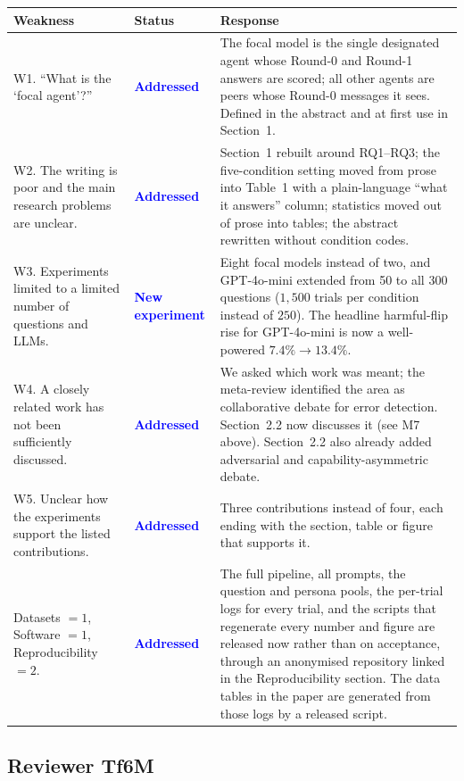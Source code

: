 \documentclass[11pt]{article}
\newcommand{\done}{\textcolor{blue}{\textbf{Addressed}}}
\newcommand{\newexp}{\textcolor{blue}{\textbf{New experiment}}}
\begin{document}
\begin{longtable}{@{}p{}p{}p{}@{}}
\toprule
\textbf{Weakness} & \textbf{Status} & \textbf{Response} \\
\midrule
\endhead
W1. ``What is the `focal agent'?''
& \done
& The focal model is the single designated agent whose Round-0 and Round-1
  answers are scored; all other agents are peers whose Round-0 messages it sees.
  Defined in the abstract and at first use in Section~1. \\
\addlinespace
W2. The writing is poor and the main research problems are unclear.
& \done
& Section~1 rebuilt around RQ1--RQ3; the five-condition setting moved from prose
  into Table~1 with a plain-language ``what it answers'' column; statistics moved
  out of prose into tables; the abstract rewritten without condition codes. \\
\addlinespace
W3. Experiments limited to a limited number of questions and LLMs.
& \newexp
& Eight focal models instead of two, and GPT-4o-mini extended from 50 to all
  300 questions ($1{,}500$ trials per condition instead of $250$). The headline
  harmful-flip rise for GPT-4o-mini is now a well-powered $7.4\%\to13.4\%$. \\
\addlinespace
W4. A closely related work has not been sufficiently discussed.
& \done
& We asked which work was meant; the meta-review identified the area as
  collaborative debate for error detection. Section~2.2 now discusses it (see
  M7 above). Section~2.2 also already added adversarial and
  capability-asymmetric debate. \\
\addlinespace
W5. Unclear how the experiments support the listed contributions.
& \done
& Three contributions instead of four, each ending with the section, table or
  figure that supports it. \\
\addlinespace
Datasets $=1$, Software $=1$, Reproducibility $=2$.
& \done
& The full pipeline, all prompts, the question and persona pools, the per-trial
  logs for every trial, and the scripts that regenerate every number and figure
  are released now rather than on acceptance, through an anonymised repository
  linked in the Reproducibility section. The data tables in the paper are
  generated from those logs by a released script. \\
\bottomrule
\end{longtable}

\subsection*{Reviewer Tf6M}
\end{document}
